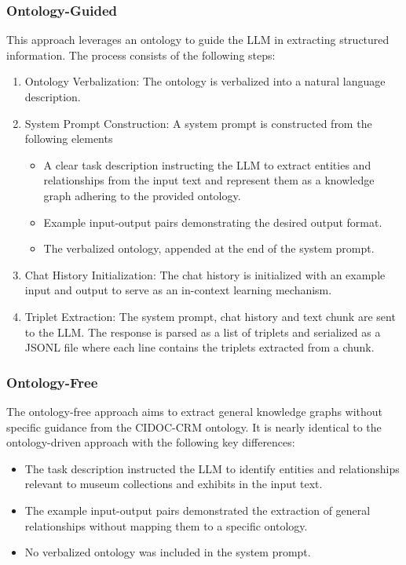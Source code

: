 \documentclass[a4, conference]{IEEEtran}
\begin{document}
\subsubsection{Ontology-Guided}

This approach leverages an ontology to guide the LLM in extracting structured information. The process consists of the following steps:

\begin{enumerate}
    \item Ontology Verbalization: The ontology is verbalized into a natural language description.
    \item System Prompt Construction: A system prompt is constructed from the following elements
          \begin{itemize}
              \item A clear task description instructing the LLM to extract entities and relationships from the input text and represent them as a knowledge graph adhering to the provided ontology.
              \item Example input-output pairs demonstrating the desired output format.
              \item The verbalized ontology, appended at the end of the system prompt.
          \end{itemize}
    \item Chat History Initialization: The chat history is initialized with an example input and output to serve as an in-context learning mechanism.
    \item Triplet Extraction: The system prompt, chat history and text chunk are sent to the LLM. The response is parsed as a list of triplets and serialized as a JSONL file where each line contains the triplets extracted from a chunk.
\end{enumerate}

\subsubsection{Ontology-Free}

The ontology-free approach aims to extract general knowledge graphs without specific guidance from the CIDOC-CRM ontology. It is nearly identical to the ontology-driven approach with the following key differences:

\begin{itemize}
    \item The task description instructed the LLM to identify entities and relationships relevant to museum collections and exhibits in the input text.
    \item The example input-output pairs demonstrated the extraction of general relationships without mapping them to a specific ontology.
    \item No verbalized ontology was included in the system prompt.
\end{itemize}
\end{document}
